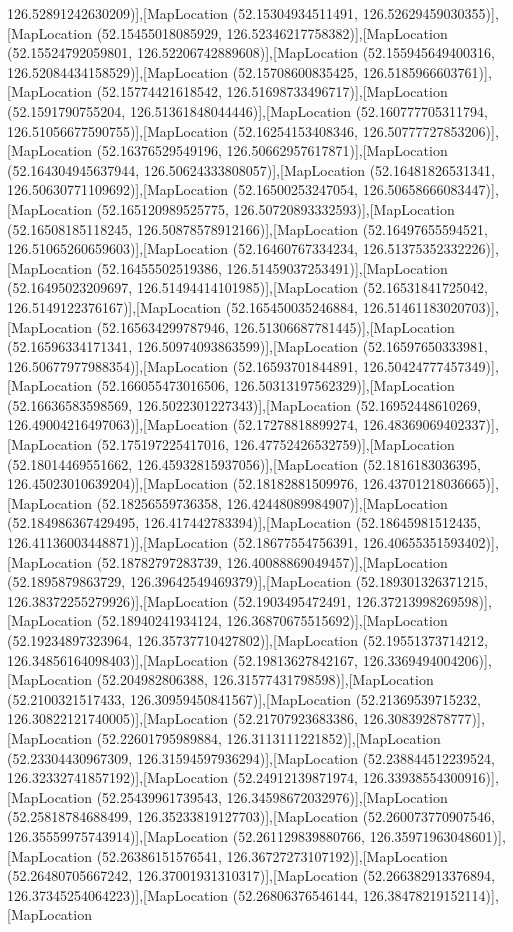 126.52891242630209)],[MapLocation (52.15304934511491, 126.52629459030355)],[MapLocation (52.15455018085929, 126.52346217758382)],[MapLocation (52.15524792059801, 126.52206742889608)],[MapLocation (52.155945649400316, 126.52084434158529)],[MapLocation (52.15708600835425, 126.5185966603761)],[MapLocation (52.15774421618542, 126.51698733496717)],[MapLocation (52.1591790755204, 126.51361848044446)],[MapLocation (52.160777705311794, 126.51056677590755)],[MapLocation (52.16254153408346, 126.50777727853206)],[MapLocation (52.16376529549196, 126.50662957617871)],[MapLocation (52.164304945637944, 126.50624333808057)],[MapLocation (52.16481826531341, 126.50630771109692)],[MapLocation (52.16500253247054, 126.50658666083447)],[MapLocation (52.165120989525775, 126.50720893332593)],[MapLocation (52.16508185118245, 126.50878578912166)],[MapLocation (52.16497655594521, 126.51065260659603)],[MapLocation (52.16460767334234, 126.51375352332226)],[MapLocation (52.16455502519386, 126.51459037253491)],[MapLocation (52.16495023209697, 126.51494414101985)],[MapLocation (52.16531841725042, 126.5149122376167)],[MapLocation (52.165450035246884, 126.51461183020703)],[MapLocation (52.165634299787946, 126.51306687781445)],[MapLocation (52.16596334171341, 126.50974093863599)],[MapLocation (52.16597650333981, 126.50677977988354)],[MapLocation (52.16593701844891, 126.50424777457349)],[MapLocation (52.166055473016506, 126.50313197562329)],[MapLocation (52.16636583598569, 126.5022301227343)],[MapLocation (52.16952448610269, 126.49004216497063)],[MapLocation (52.17278818899274, 126.48369069402337)],[MapLocation (52.175197225417016, 126.47752426532759)],[MapLocation (52.18014469551662, 126.45932815937056)],[MapLocation (52.1816183036395, 126.45023010639204)],[MapLocation (52.18182881509976, 126.43701218036665)],[MapLocation (52.18256559736358, 126.42448089984907)],[MapLocation (52.184986367429495, 126.417442783394)],[MapLocation (52.18645981512435, 126.41136003448871)],[MapLocation (52.18677554756391, 126.40655351593402)],[MapLocation (52.18782797283739, 126.40088869049457)],[MapLocation (52.1895879863729, 126.39642549469379)],[MapLocation (52.189301326371215, 126.38372255279926)],[MapLocation (52.1903495472491, 126.37213998269598)],[MapLocation (52.18940241934124, 126.36870675515692)],[MapLocation (52.19234897323964, 126.35737710427802)],[MapLocation (52.19551373714212, 126.34856164098403)],[MapLocation (52.19813627842167, 126.3369494004206)],[MapLocation (52.204982806388, 126.31577431798598)],[MapLocation (52.2100321517433, 126.30959450841567)],[MapLocation (52.21369539715232, 126.30822121740005)],[MapLocation (52.21707923683386, 126.308392878777)],[MapLocation (52.22601795989884, 126.3113111221852)],[MapLocation (52.23304430967309, 126.31594597936294)],[MapLocation (52.238844512239524, 126.32332741857192)],[MapLocation (52.24912139871974, 126.33938554300916)],[MapLocation (52.25439961739543, 126.34598672032976)],[MapLocation (52.25818784688499, 126.35233819127703)],[MapLocation (52.260073770907546, 126.35559975743914)],[MapLocation (52.261129839880766, 126.35971963048601)],[MapLocation (52.26386151576541, 126.36727273107192)],[MapLocation (52.26480705667242, 126.37001931310317)],[MapLocation (52.266382913376894, 126.37345254064223)],[MapLocation (52.26806376546144, 126.38478219152114)],[MapLocation 